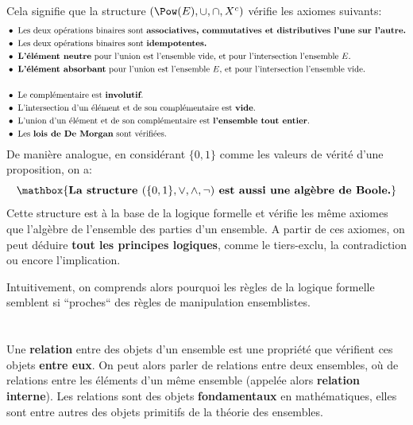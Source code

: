 Cela signifie que la structure \((\Pow(E), \cup, \cap, X^c)\) vérifie les axiomes suivants:
\begin{align*}
    &\bullet \text{ Les deux opérations binaires sont \textbf{associatives, commutatives et distributives l'une sur l'autre.}}\\
    &\bullet \text{ Les deux opérations binaires sont \textbf{idempotentes.}}\\
    &\bullet \text{ \textbf{L'élément neutre} pour l'union est l'ensemble vide, et pour l'intersection l'ensemble \(E\).}\\
    &\bullet \text{ \textbf{L'élément absorbant} pour l'union est l'ensemble \(E\), et pour l'intersection l'ensemble vide.}\\
    &\\
    &\bullet \text{ Le complémentaire est \textbf{involutif}.}\\
    &\bullet \text{ L'intersection d'un élément et de son complémentaire est \textbf{vide}.}\\
    &\bullet \text{ L'union d'un élément et de son complémentaire est \textbf{l'ensemble tout entier}.}\\
    &\bullet \text{ Les \textbf{lois de De Morgan} sont vérifiées.}\\
\end{align*}
De manière analogue, en considérant \(\{0, 1\}\) comme les valeurs de vérité d'une proposition, on a:
\[
    \mathbox{
        \textbf{La structure } (\{0, 1\}, \lor, \land, \lnot) \textbf{ est aussi une algèbre de Boole.}
    }
\]
Cette structure est à la base de la logique formelle et vérifie les même axiomes que l'algèbre de l'ensemble des parties d'un ensemble.\+
A partir de ces axiomes, on peut déduire \textbf{tout les principes logiques}, comme le tiers-exclu, la contradiction ou encore l'implication.\<

Intuitivement, on comprends alors pourquoi les règles de la logique formelle semblent si ``proches`` des règles de manipulation ensemblistes. 


\chapter*{}
Une \textbf{relation} entre des objets d'un ensemble est une propriété que vérifient ces objets \textbf{entre eux}.\+
On peut alors parler de relations entre deux ensembles, où de relations entre les éléments d'un même ensemble (appelée alors \textbf{relation interne}).\+
Les relations sont des objets \textbf{fondamentaux} en mathématiques, elles sont entre autres des objets primitifs de la théorie des ensembles.\<

